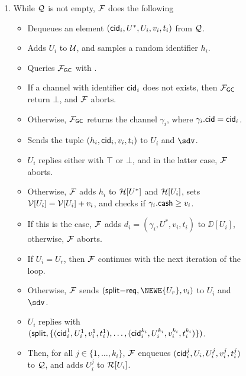 \begin{figure*}[!t]
{{\begin{enumerate}
	\item While $\mathcal{Q}$ is not empty, $\mathcal{F}$ does the following
	\begin{itemize}[label=-]
		\item Dequeues an element $(\mathsf{cid}_i,U^*,U_i,v_i,t_i)$ from $\mathcal{Q}$.
		\item Adds $U_i$ to $\mathcal{U}$, and samples a random identifier $h_i$.
		\item Queries $\mathcal{F}_{\mathsf{GC}}$ with .
		\item If a channel with identifier $\mathsf{cid}_i$ does not exists, then $\mathcal{F}_{\mathsf{GC}}$ return 
		$\bot$, and $\mathcal{F}$ aborts.
		\item Otherwise, $\mathcal{F}_{\mathsf{GC}}$ returns the channel $\gamma_i$, where $\gamma_i.\mathsf{cid} = 
		\mathsf{cid}_i$.
		\item Sends the tuple $(h_i, \mathsf{cid}_i, v_i, t_i)$ to $U_i$ and $\sdv$. 
		\item $U_i$ replies either with $\top$ or $\bot$, and in the latter case, $\mathcal{F}$ aborts.
		\item Otherwise, $\mathcal{F}$ adds $h_i$ to $\mathcal{H}[U^*]$ and $\mathcal{H}[U_i]$, sets $\mathcal{V}[U_i] = \mathcal{V}[U_i] 
		+ v_i$, and checks if $\gamma_i.\mathsf{cash} \geq v_i$.
		\item If this is the case, $\mathcal{F}$ adds $d_i = (\gamma_i,U^*,v_i,t_i)$ to $\DD[U_i]$, 
		otherwise, $\mathcal{F}$ aborts.
		\item If $U_i = U_r$, then $\mathcal{F}$ continues with the next iteration of the loop.
		\item Otherwise, $\mathcal{F}$ sends $(\mathsf{split}\mathsf{-req}, \NEWE{U_r}, v_i)$ to $U_i$ 
		and $\sdv$. 
		\item $U_i$ replies with $(\mathsf{split}, \{(\mathsf{cid}_i^1,U_i^1,v_i^1,t_i^1),\ldots,
		(\mathsf{cid}_i^{k_i},U_i^{k_i},v_i^{k_i},t_i^{k_i})\})$.
		\item Then, for all $j \in \{1,\ldots,k_i\}$, $\mathcal{F}$ enqueues 
		$(\mathsf{cid}_i^j,U_i,U_i^j,v_i^j,t_i^j)$ to $\mathcal{Q}$, and adds $U_i^j$ to $\mathcal{R}[U_i]$.
	\end{itemize}
	
	
	

\end{enumerate}}}
\end{figure*}
